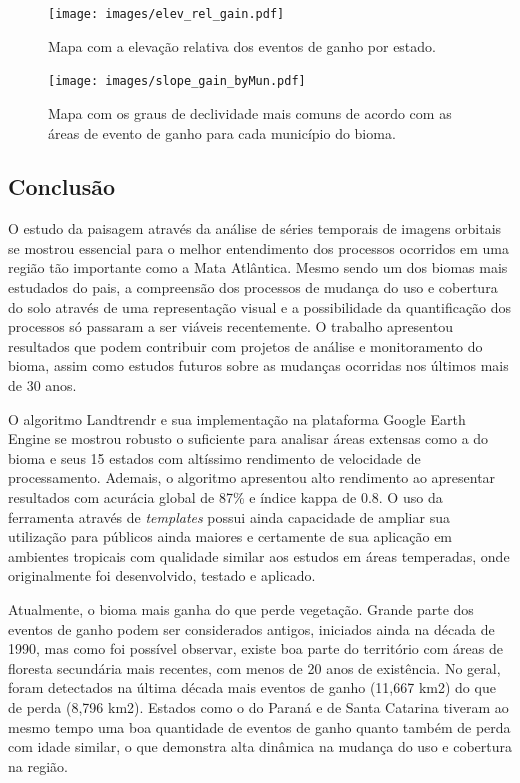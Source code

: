 \begin{figure}[H]
    \centering
    \texttt{[image: images/elev\_rel\_gain.pdf]}
    \caption{Mapa com a elevação relativa dos eventos de ganho por estado.}
    \label{fig:elev_rel_gain}
\end{figure}

\begin{figure}[H]
    \centering
    \texttt{[image: images/slope\_gain\_byMun.pdf]}
    \caption{Mapa com os graus de declividade mais comuns de acordo com as áreas de evento de ganho para cada município do bioma.}
    \label{fig:slope_gain_byMun}
\end{figure}


\subsection{Conclusão}

\hspace{13pt} O estudo da paisagem através da análise de séries temporais de imagens orbitais se mostrou essencial para o melhor entendimento dos processos ocorridos em uma região tão importante como a Mata Atlântica. Mesmo sendo um dos biomas mais estudados do pais, a compreensão dos processos de mudança do uso e cobertura do solo através de uma representação visual e a possibilidade da quantificação dos processos só passaram a ser viáveis recentemente. O trabalho apresentou resultados que podem contribuir com projetos de análise e monitoramento do bioma, assim como estudos futuros sobre as mudanças ocorridas nos últimos mais de 30 anos. 

O algoritmo Landtrendr e sua implementação na plataforma Google Earth Engine se mostrou robusto o suficiente para analisar áreas extensas como a do bioma e seus 15 estados com altíssimo rendimento de velocidade de processamento. Ademais, o algoritmo apresentou alto rendimento ao apresentar resultados com acurácia global de 87\% e índice kappa de 0.8. O uso da ferramenta através de \textit{templates} possui ainda capacidade de ampliar sua utilização para públicos ainda maiores e certamente de sua aplicação em ambientes tropicais com qualidade similar aos estudos em áreas temperadas, onde originalmente foi desenvolvido, testado e aplicado.

Atualmente, o bioma mais ganha do que perde vegetação. Grande parte dos eventos de ganho podem ser considerados antigos, iniciados ainda na década de 1990, mas como foi possível observar, existe boa parte do território com áreas de floresta secundária mais recentes, com menos de 20 anos de existência. No geral, foram detectados na última década mais eventos de ganho (11,667 km2) do que de perda (8,796 km2). Estados como o do Paraná e de Santa Catarina tiveram ao mesmo tempo uma boa quantidade de eventos de ganho quanto também de perda com idade similar, o que demonstra alta dinâmica na mudança do uso e cobertura na região.

